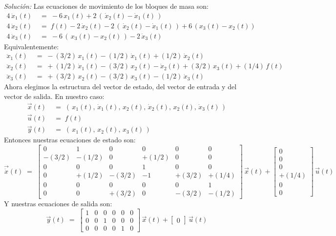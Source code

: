 \documentclass[ a4paper, twoside, 11pt]{article}
\begin{document}
\begin{problem}
\emph{Soluci\'on:} Las ecuaciones de movimiento de los bloques de masa son: 
\begin{align*}
4 \, \ddot{x}_1(t) \;
& = \; -6 \, x_1(t) + 2 \, ( \, \dot{x}_2(t) - \dot{x}_1(t) \, ) \\
4 \, \ddot{x}_2(t) \;
& = \; f(t) -2 \, \dot{x}_2(t) - 2 \, ( \, \dot{x}_2(t) - \dot{x}_1(t) \, ) + 6 \, ( x_3(t) - x_2(t) ) \\
4 \, \ddot{x}_3(t) \;
& = \; -6 \, ( \, x_3(t) - x_2(t) \, ) - 2 \, \dot{x}_3(t)
\end{align*}
Equivalentemente: 
\begin{align*}
\ddot{x}_1(t) \;
& = \; -(3/2) \, x_1(t) - (1/2) \, \dot{x}_1(t) + (1/2) \, \dot{x}_2(t) \\
\ddot{x}_2(t) \;
& = \; +(1/2) \, \dot{x}_1(t) - (3/2) \, x_2(t) - \dot{x}_2(t) + (3/2) \, x_3(t) + (1/4) \, f(t) \\
\ddot{x}_3(t) \;
& = \; +(3/2) \, x_2(t) - (3/2) \, x_3(t) - (1/2) \, \dot{x}_3(t)
\end{align*}
Ahora elegimos la estructura del vector de estado, del vector de entrada y del vector de salida. En nuestro caso: 
\begin{align*}
\vec{x}(t) \;
& = \; (\,
x_1(t), \, \dot{x}_1(t), \,
x_2(t), \, \dot{x}_2(t), \,
x_2(t), \, \dot{x}_3(t) \, ) \\
\vec{u}(t) \;
& = \; f(t) \\
\vec{y}(t) \;
& = \; (\, x_1(t), \, x_2(t), \, x_3(t) \, )
\end{align*}
Entonces nuestras ecuaciones de estado son: 
\[
\vec{\dot{x}}(t) \; = \; 
\left[ \begin{array}{cccccc}
0 & 1 & 0 & 0 & 0 & 0 \\
-(3/2) & -(1/2) & 0 & +(1/2) & 0 & 0 \\
0 & 0 & 0 & 1 & 0 & 0 \\
0 & +(1/2) & -(3/2) & -1 & +(3/2) & +(1/4) \\
0 & 0 & 0 & 0 & 0 & 1 \\
0 & 0 & +(3/2) & 0 & -(3/2) & -(1/2)
\end{array} \right] \, \vec{x}(t) +
\left[ \begin{array}{c}
0 \\ 0 \\ 0 \\ +(1/4) \\ 0 \\ 0
\end{array} \right] \, \vec{u}(t)
\]
Y nuestras ecuaciones de salida son: 
\[
\vec{y}(t) \; = \;
\left[ \begin{array}{cccccc}
1 & 0 & 0 & 0 & 0 & 0 \\
0 & 0 & 1 & 0 & 0 & 0 \\
0 & 0 & 0 & 0 & 1 & 0
\end{array} \right] \, \vec{x}(t) +
\left[ \begin{array}{c}
0
\end{array} \right] \, \vec{u}(t)
\]

\end{problem}
\vspace{\baselineskip}
\end{document}
